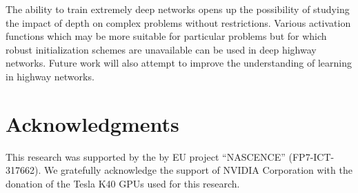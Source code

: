 \documentclass{article}
\begin{document}
The ability to train extremely deep networks opens up the possibility of studying the impact of depth on complex problems without restrictions. Various activation functions which may be more suitable for particular problems but for which robust initialization schemes are unavailable can be used in deep highway networks. Future work will also attempt to improve the understanding of learning in highway networks.

\section*{Acknowledgments}
This research was supported by the by EU project ``NASCENCE'' (FP7-ICT-317662).
We gratefully acknowledge the support of NVIDIA Corporation with the donation of the Tesla K40 GPUs used for this research.



\end{document}
